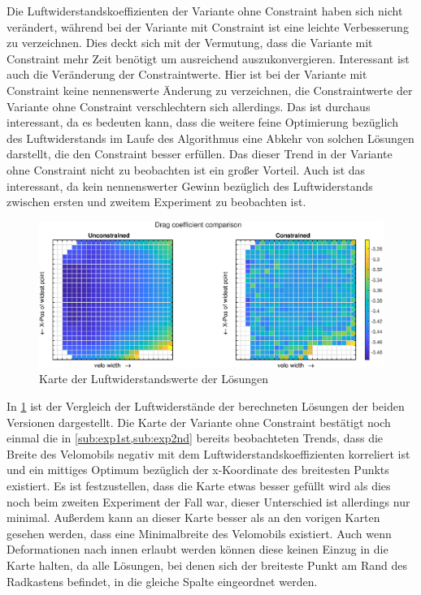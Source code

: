 Die Luftwiderstandskoeffizienten der Variante ohne Constraint haben sich nicht verändert, während bei der Variante mit Constraint ist eine leichte Verbesserung zu verzeichnen.
Dies deckt sich mit der Vermutung, dass die Variante mit Constraint mehr Zeit benötigt um ausreichend auszukonvergieren.
Interessant ist auch die Veränderung der Constraintwerte.
Hier ist bei der Variante mit Constraint keine nennenswerte Änderung zu verzeichnen, die Constraintwerte der Variante ohne Constraint verschlechtern sich allerdings.
Das ist durchaus interessant, da es bedeuten kann, dass die weitere feine Optimierung bezüglich des Luftwiderstands im Laufe des Algorithmus eine Abkehr von solchen Lösungen darstellt, die den Constraint besser erfüllen.
Das dieser Trend in der Variante ohne Constraint nicht zu beobachten ist ein großer Vorteil.
Auch ist das interessant, da kein nennenswerter Gewinn bezüglich des Luftwiderstands zwischen ersten und zweitem Experiment zu beobachten ist.

\begin{figure}[h]
	\includegraphics[width=1\linewidth]{bilder/6pt1000Samples/dragMapComparison}
	\caption{Karte der Luftwiderstandswerte der Lösungen}
	\label{fig:3rdmapDrag}
\end{figure}

In \cref{fig:3rdmapDrag} ist der Vergleich der Luftwiderstände der berechneten Lösungen der beiden Versionen dargestellt.
Die Karte der Variante ohne Constraint bestätigt noch einmal die in \cref{sub:exp1st,sub:exp2nd} bereits beobachteten Trends, dass die Breite des Velomobils negativ mit dem Luftwiderstandskoeffizienten korreliert ist und ein mittiges Optimum bezüglich der x-Koordinate des breitesten Punkts existiert.
Es ist festzustellen, dass die Karte etwas besser gefüllt wird als dies noch beim zweiten Experiment der Fall war, dieser Unterschied ist allerdings nur minimal.
Außerdem kann an dieser Karte besser als an den vorigen Karten gesehen werden, dass eine Minimalbreite des Velomobils existiert.
Auch wenn Deformationen nach innen erlaubt werden können diese keinen Einzug in die Karte halten, da alle Lösungen, bei denen sich der breiteste Punkt am Rand des Radkastens befindet, in die gleiche Spalte eingeordnet werden.

